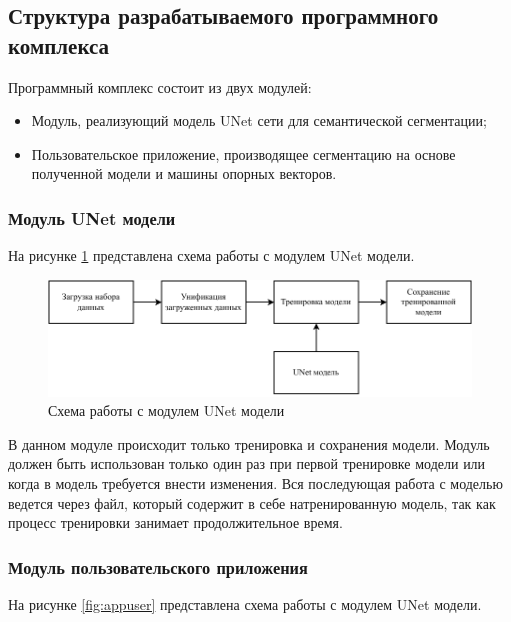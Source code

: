 \subsection{Структура разрабатываемого программного комплекса}

Программный комплекс состоит из двух модулей:
\begin{itemize}
	\item Модуль, реализующий модель UNet сети для семантической сегментации;
	\item Пользовательское приложение, производящее сегментацию на основе полученной модели и машины опорных векторов.
\end{itemize}

\subsubsection{Модуль UNet модели}

На рисунке \ref{fig:appunet} представлена схема работы с модулем UNet модели.

\begin{figure}[H]
	\centering
	\includegraphics[width=\textwidth]{img/appunet.pdf}
	\caption{Схема работы с модулем UNet модели}
	\label{fig:appunet}
\end{figure}

В данном модуле происходит только тренировка и сохранения модели. Модуль должен быть использован только один раз при первой тренировке модели или когда в модель требуется внести изменения. Вся последующая работа с моделью ведется через файл, который содержит в себе натренированную модель, так как процесс тренировки занимает продолжительное время.

\subsubsection{Модуль пользовательского приложения}

На рисунке \ref{fig:appuser} представлена схема работы с модулем UNet модели.

